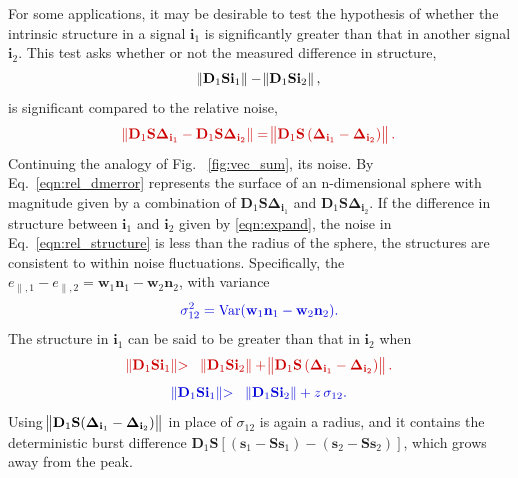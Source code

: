\documentclass[twocolumn]{aastex631}
\newcommand{\Var}{\operatorname{Var}} %
\providecommand{\DIFadd}[1]{{\protect\color{BLUE}#1}} %
\providecommand{\DIFdel}[1]{{\protect\color{RED}#1}} %
\providecommand{\DIFaddbegin}{} \providecommand{\DIFaddend}{} %
\providecommand{\DIFdelbegin}{} \providecommand{\DIFdelend}{} %
\newcommand{\DIFscaledelfig}{0.5}
\newlength{\DIFdelgraphicswidth} %
\newlength{\DIFdelgraphicsheight} %
\newcommand{\DIFaddincludegraphics}[2][]{{\color{blue}\fbox{\DIFOincludegraphics[#1]{#2}}}} %
\newcommand{\DIFdelincludegraphics}[2][]{%
\sbox{\DIFdelgraphicsbox}{\DIFOincludegraphics[#1]{#2}}%
\settoboxwidth{\DIFdelgraphicswidth}{\DIFdelgraphicsbox} %
\settoboxtotalheight{\DIFdelgraphicsheight}{\DIFdelgraphicsbox} %
\scalebox{\DIFscaledelfig}{%
\parbox[b]{\DIFdelgraphicswidth}{\usebox{\DIFdelgraphicsbox}\\[-\baselineskip] \rule{\DIFdelgraphicswidth}{0em}}\llap{\resizebox{\DIFdelgraphicswidth}{\DIFdelgraphicsheight}{%
\setlength{\unitlength}{\DIFdelgraphicswidth}%
\begin{picture}(1,1)%
\thicklines\linethickness{2pt} %
{\color[rgb]{1,0,0}\put(0,0){\framebox(1,1){}}}%
{\color[rgb]{1,0,0}\put(0,0){\line( 1,1){1}}}%
{\color[rgb]{1,0,0}\put(0,1){\line(1,-1){1}}}%
\end{picture}%
}\hspace*{3pt}}} %
} %
\DeclareRobustCommand{\DIFaddbegin}{\DIFOaddbegin \let\includegraphics\DIFaddincludegraphics} %
\DeclareRobustCommand{\DIFaddend}{\DIFOaddend \let\includegraphics\DIFOincludegraphics} %
\DeclareRobustCommand{\DIFdelbegin}{\DIFOdelbegin \let\includegraphics\DIFdelincludegraphics} %
\DeclareRobustCommand{\DIFdelend}{\DIFOaddend \let\includegraphics\DIFOincludegraphics} %
\begin{document}
For some applications, it may be desirable to test the hypothesis of whether the intrinsic structure in a signal ${\mathbf{i}_1}$ is significantly greater than that in another signal ${\mathbf{i}_2}$. This test asks whether or not the measured difference in structure,
%
\begin{eqnarray}
\norm{\mathbf{D}_1\mathbf{S} {\mathbf{i}_1}} - \norm{\mathbf{D}_1\mathbf{S} {\mathbf{i}_2}}, \label{eqn:rel_structure}
\end{eqnarray}
%
is significant compared to \DIFdelbegin \DIFdel{the relative noise,
}\begin{eqnarray*}
\DIFdel{\norm{\mathbf{D}_1\mathbf{S} \mathbf{\Delta}_{\mathbf{i}_1} - \mathbf{D}_1\mathbf{S} \mathbf{\Delta}_{\mathbf{i}_2} } = \norm{\mathbf{D}_1\mathbf{S}\left( \mathbf{\Delta}_{\mathbf{i}_1} - \mathbf{\Delta}_{\mathbf{i}_2} \right) }. \label{eqn:rel_dmerror}
}\end{eqnarray*}%
\DIFdel{Continuing the analogy of Fig. ~\ref{fig:vec_sum}, }\DIFdelend \DIFaddbegin \DIFadd{its noise. By }\DIFaddend Eq.~\DIFdelbegin \DIFdel{\eqref{eqn:rel_dmerror} represents the surface of an n-dimensional sphere with magnitude given by a combination of $\mathbf{D}_1\mathbf{S} \mathbf{\Delta}_{\mathbf{i}_1}$ and $\mathbf{D}_1\mathbf{S} \mathbf{\Delta}_{\mathbf{i}_2}$. If the difference in structure between $\mathbf{i}_1$ and $\mathbf{i}_2$ given by }\DIFdelend \DIFaddbegin \DIFadd{\eqref{eqn:expand}, the noise in }\DIFaddend Eq.~\eqref{eqn:rel_structure} is \DIFdelbegin \DIFdel{less than the radius of the sphere, the structures are consistent to within noise fluctuations. Specifically, the }\DIFdelend \DIFaddbegin \DIFadd{$e_{\parallel,1}-e_{\parallel,2}=\mathbf{w}_1\mathbf{n}_1-\mathbf{w}_2\mathbf{n}_2$, with variance
}\begin{eqnarray}
\DIFadd{\sigma_{12}^2=\Var(\mathbf{w}_1\mathbf{n}_1-\mathbf{w}_2\mathbf{n}_2). \label{eqn:rel_dmerror}
}\end{eqnarray}
\DIFadd{The }\DIFaddend structure in $\mathbf{i}_1$ can be said to be greater than that in $\mathbf{i}_2$ when 
%
\DIFdelbegin \begin{eqnarray*}
\DIFdel{\norm{\mathbf{D}_1\mathbf{S} {\mathbf{i}_1}} }& \DIFdel{> }& \DIFdel{\norm{\mathbf{D}_1\mathbf{S} {\mathbf{i}_2}} + \norm{\mathbf{D}_1\mathbf{S}\left( \mathbf{\Delta}_{\mathbf{i}_1} - \mathbf{\Delta}_{\mathbf{i}_2} \right) }. \label{eqn:add_error}
}\end{eqnarray*}%
\DIFdelend \DIFaddbegin \begin{eqnarray}
\DIFadd{\norm{\mathbf{D}_1\mathbf{S} {\mathbf{i}_1}} }& \DIFadd{> }& \DIFadd{\norm{\mathbf{D}_1\mathbf{S} {\mathbf{i}_2}} + z\,\sigma_{12}. \label{eqn:add_error}
}\end{eqnarray}\DIFaddend 
\DIFaddbegin \DIFadd{Using $\norm{\mathbf{D}_1\mathbf{S}( \mathbf{\Delta}_{\mathbf{i}_1} - \mathbf{\Delta}_{\mathbf{i}_2})}$ in place of $\sigma_{12}$ is again a radius, and it contains the deterministic burst difference $\mathbf{D}_1\mathbf{S}[(\mathbf{s}_1-\mathbf{S}\mathbf{s}_1)-(\mathbf{s}_2-\mathbf{S}\mathbf{s}_2)]$, which grows away from the peak.
}\DIFaddend 
\end{document}
